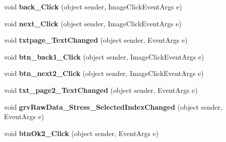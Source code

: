 \begin{DoxyCompactItemize}
\item 
\hypertarget{classusertrackmyhealth__stress_a78527c6f9d94189c61aec1a83862dde8}{void {\bfseries back\-\_\-\-Click} (object sender, Image\-Click\-Event\-Args e)}\label{classusertrackmyhealth__stress_a78527c6f9d94189c61aec1a83862dde8}

\item 
\hypertarget{classusertrackmyhealth__stress_a3e1db119c858804a2323cea6b0fd1f91}{void {\bfseries next\-\_\-\-Click} (object sender, Image\-Click\-Event\-Args e)}\label{classusertrackmyhealth__stress_a3e1db119c858804a2323cea6b0fd1f91}

\item 
\hypertarget{classusertrackmyhealth__stress_ae8b74b34a6f70e8570f6ccc7b1a6a484}{void {\bfseries txtpage\-\_\-\-Text\-Changed} (object sender, Event\-Args e)}\label{classusertrackmyhealth__stress_ae8b74b34a6f70e8570f6ccc7b1a6a484}

\item 
\hypertarget{classusertrackmyhealth__stress_ae016f80aefabcacbe0147537de3a7f04}{void {\bfseries btn\-\_\-back1\-\_\-\-Click} (object sender, Image\-Click\-Event\-Args e)}\label{classusertrackmyhealth__stress_ae016f80aefabcacbe0147537de3a7f04}

\item 
\hypertarget{classusertrackmyhealth__stress_a913f1aaa87d645a6c7429800c896f5d4}{void {\bfseries btn\-\_\-next2\-\_\-\-Click} (object sender, Image\-Click\-Event\-Args e)}\label{classusertrackmyhealth__stress_a913f1aaa87d645a6c7429800c896f5d4}

\item 
\hypertarget{classusertrackmyhealth__stress_ae8ebbc3a6a426d668bafa454b38750cf}{void {\bfseries txt\-\_\-page2\-\_\-\-Text\-Changed} (object sender, Event\-Args e)}\label{classusertrackmyhealth__stress_ae8ebbc3a6a426d668bafa454b38750cf}

\item 
\hypertarget{classusertrackmyhealth__stress_a91ce30189b02109038608c7aea5c6a81}{void {\bfseries grv\-Raw\-Data\-\_\-\-Stress\-\_\-\-Selected\-Index\-Changed} (object sender, Event\-Args e)}\label{classusertrackmyhealth__stress_a91ce30189b02109038608c7aea5c6a81}

\item 
\hypertarget{classusertrackmyhealth__stress_a0210c1b8b9856b655d8d2c603056f08a}{void {\bfseries btn\-Ok2\-\_\-\-Click} (object sender, Event\-Args e)}\label{classusertrackmyhealth__stress_a0210c1b8b9856b655d8d2c603056f08a}


\end{DoxyCompactItemize}
